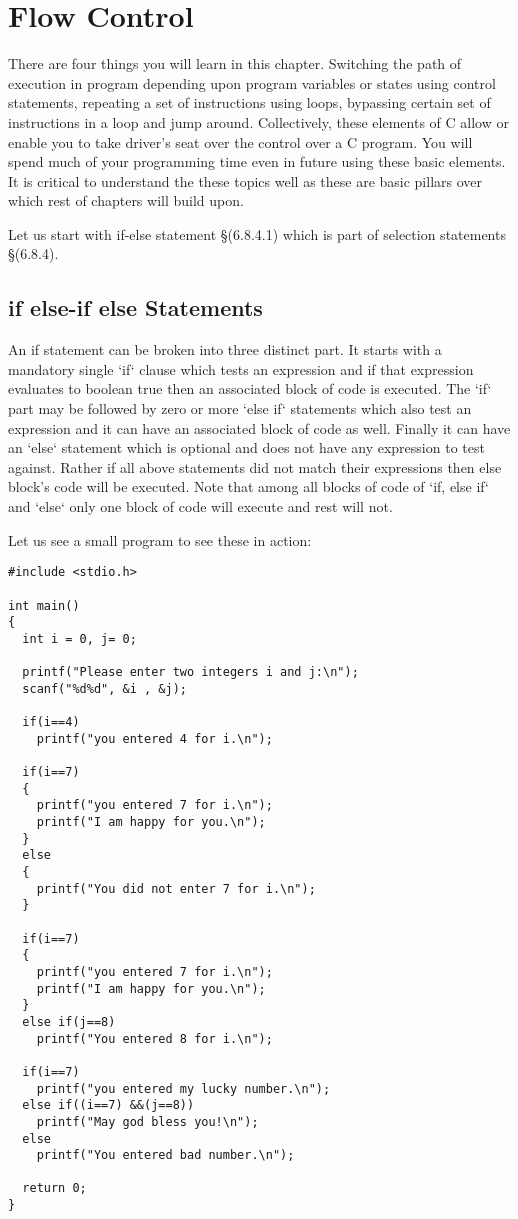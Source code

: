 \chapter{Flow Control}
There are four things you will learn in this chapter. Switching the path of 
execution in program depending upon program variables or states using control 
statements, repeating a set of instructions using loops, bypassing certain set
of instructions in a loop and jump around. Collectively, these elements of C
allow or enable you to take driver's seat over the control over a C program.
You will spend much of your programming time even in future using these basic
elements. It is critical to understand the these topics well as these are basic
pillars over which rest of chapters will build upon.

Let us start with if-else statement \S(6.8.4.1) which is part of selection
statements \S(6.8.4).

\section{if else-if else Statements}
An if statement can be broken into three distinct part. It starts with a
mandatory single `if` clause which tests an expression and if that expression
evaluates to boolean true then an associated block of code is executed. The
`if` part may be followed by zero or more `else if` statements which also test
an expression and it can have an associated block of code as well. Finally it
can have an `else` statement which is optional and does not have any expression
to test against. Rather if all above statements did not match their expressions
then else block's code will be executed. Note that among all blocks of code of
`if, else if` and `else` only one block of code will execute and rest will
not.

Let us see a small program to see these in action:

\begin{Verbatim}[frame=single]
#include <stdio.h>

int main()
{
  int i = 0, j= 0;
    
  printf("Please enter two integers i and j:\n");
  scanf("%d%d", &i , &j);
  
  if(i==4)
    printf("you entered 4 for i.\n");

  if(i==7)
  {
    printf("you entered 7 for i.\n");
    printf("I am happy for you.\n");
  }
  else
  {
    printf("You did not enter 7 for i.\n");
  }
  
  if(i==7)
  {
    printf("you entered 7 for i.\n");
    printf("I am happy for you.\n");
  }
  else if(j==8)
    printf("You entered 8 for i.\n");
  
  if(i==7)
    printf("you entered my lucky number.\n");
  else if((i==7) &&(j==8))
    printf("May god bless you!\n");
  else
    printf("You entered bad number.\n");
  
  return 0;
}
\end{Verbatim}

